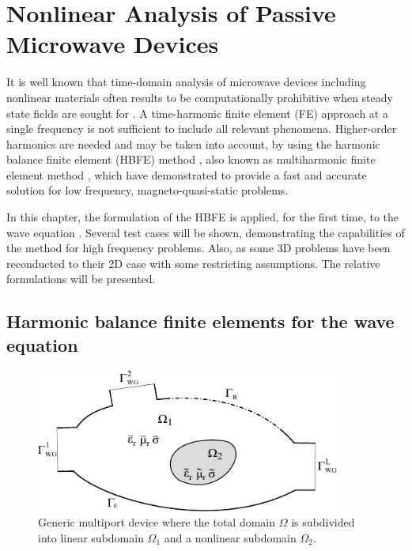 \graphicspath{{img/ch3/}}
\chapter[Nonlinear analysis]{Nonlinear Analysis of Passive Microwave Devices} \label{chap:NL}

It is well known that time-domain analysis of microwave devices including nonlinear materials often results to be computationally prohibitive when steady state fields are sought for \cite{deGersem2001}. A time-harmonic finite element (FE) approach at a single frequency is not sufficient to include all relevant phenomena. Higher-order harmonics are needed and may be taken into account, by using the harmonic balance finite element (HBFE) method \cite{yamada1988harmonic, yamada1989harmonic, yamada1991calculation}, also known as multiharmonic finite element method \cite{copeland2010domain, kolmbauer2012frequency}, which have demonstrated to provide a fast and accurate solution for low frequency, magneto-quasi-static problems.

In this chapter, the formulation of the HBFE is applied, for the first time, to the wave equation \cite{ntibarikure2012efficient, ntibarikure2014harmonic}. Several test cases will be shown, demonstrating the capabilities of the method for high frequency problems. Also, as some 3D problems have been reconducted to their 2D case with some restricting assumptions. The relative formulations will be presented.



\section{Harmonic balance finite elements for the wave equation}
\label{sec:formulation}


\begin{figure}[!ht]
\centering
\includegraphics[width=10cm]{geometryLarge}
\caption{Generic multiport device where the total domain $\Omega$ is subdivided into linear subdomain $\Omega_1$ and a nonlinear subdomain $\Omega_2$.}
\label{fig:geometry}
\end{figure}

